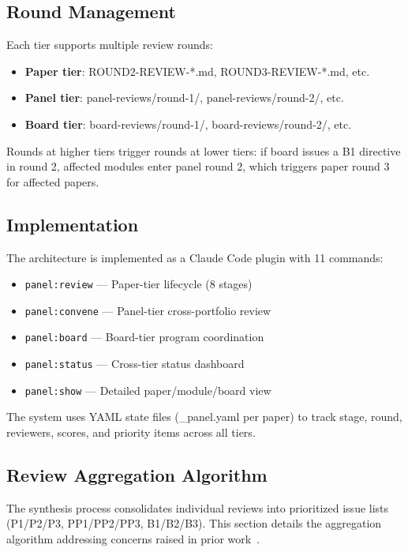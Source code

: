 \subsection{Round Management}

Each tier supports multiple review rounds:
\begin{itemize}
\item \textbf{Paper tier}: ROUND2-REVIEW-*.md, ROUND3-REVIEW-*.md, etc.
\item \textbf{Panel tier}: panel-reviews/round-1/, panel-reviews/round-2/, etc.
\item \textbf{Board tier}: board-reviews/round-1/, board-reviews/round-2/, etc.
\end{itemize}

Rounds at higher tiers trigger rounds at lower tiers: if board issues a B1 directive in round 2, affected modules enter panel round 2, which triggers paper round 3 for affected papers.

\subsection{Implementation}

The architecture is implemented as a Claude Code plugin with 11 commands:
\begin{itemize}
\item \texttt{panel:review} — Paper-tier lifecycle (8 stages)
\item \texttt{panel:convene} — Panel-tier cross-portfolio review
\item \texttt{panel:board} — Board-tier program coordination
\item \texttt{panel:status} — Cross-tier status dashboard
\item \texttt{panel:show} — Detailed paper/module/board view
\end{itemize}

The system uses YAML state files (\_panel.yaml per paper) to track stage, round, reviewers, scores, and priority items across all tiers.

\subsection{Review Aggregation Algorithm}
\label{sec:aggregation}

The synthesis process consolidates individual reviews into prioritized issue lists (P1/P2/P3, PP1/PP2/PP3, B1/B2/B3). This section details the aggregation algorithm addressing concerns raised in prior work~\cite{bernstein2015crowdsourcing,kamar2016complementarity}.

